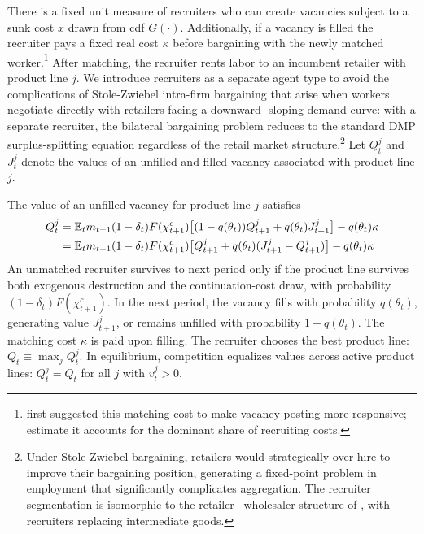 \documentclass[authoryear, review, 12pt]{elsarticle}
\begin{document}
	There is a fixed unit measure of recruiters who can create 
	vacancies subject to a sunk cost $x$ drawn from cdf $G(\cdot)$. 
	Additionally, if a vacancy is filled the recruiter pays a fixed 
	real cost $\kappa$ before bargaining with the newly matched 
	worker.\footnote{\citet{pissarides_2009} first suggested this 
		matching cost to make vacancy posting more responsive; 
		\citet{christiano_2016} estimate it accounts for the dominant 
		share of recruiting costs.} After matching, the recruiter rents 
	labor to an incumbent retailer with product line $j$. We 
	introduce recruiters as a separate agent type to avoid the 
	complications of Stole-Zwiebel intra-firm bargaining that arise 
	when workers negotiate directly with retailers facing a downward-
	sloping demand curve: with a separate recruiter, the bilateral 
	bargaining problem reduces to the standard DMP surplus-splitting 
	equation regardless of the retail market structure.\footnote{Under 
		Stole-Zwiebel bargaining, retailers would strategically over-hire 
		to improve their bargaining position, generating a fixed-point 
		problem in employment that significantly complicates aggregation. 
		The recruiter segmentation is isomorphic to the retailer--
		wholesaler structure of \citet{christiano_2016}, with recruiters 
		replacing intermediate goods.} Let $Q_t^j$ and $J_t^j$ denote 
	the values of an unfilled and filled vacancy associated with 
	product line $j$.
	
	The value of an unfilled vacancy for product line $j$ satisfies
	\begin{align}\label{eq:value_recruiter_unmatched}
		Q_{t}^j &= \mathbb{E}_t m_{t+1}(1-\delta_t)F(\chi_{t+1}^c)
		\bigl[(1-q(\theta_t))Q_{t+1}^j
		+q(\theta_{t})J_{t+1}^j\bigr]-q(\theta_t)\kappa \notag \\
		&= \mathbb{E}_t m_{t+1}(1-\delta_t)F(\chi_{t+1}^c)
		\bigl[Q_{t+1}^j+q(\theta_t)
		(J_{t+1}^j-Q_{t+1}^j)\bigr]-q(\theta_t)\kappa
	\end{align}
	An unmatched recruiter survives to next period only if the 
	product line survives both exogenous destruction and the 
	continuation-cost draw, with probability $(1-\delta_t)F(\chi_{t+1}^c)$. 
	In the next period, the vacancy fills with probability 
	$q(\theta_t)$, generating value $J_{t+1}^j$, or remains unfilled 
	with probability $1-q(\theta_t)$. The matching cost $\kappa$ 
	is paid upon filling. The recruiter chooses the best product 
	line: $Q_t\equiv\max_j Q_t^j$. In equilibrium, competition 
	equalizes values across active product lines: $Q_t^j=Q_t$ for 
	all $j$ with $v_t^j>0$.
	
\end{document}
